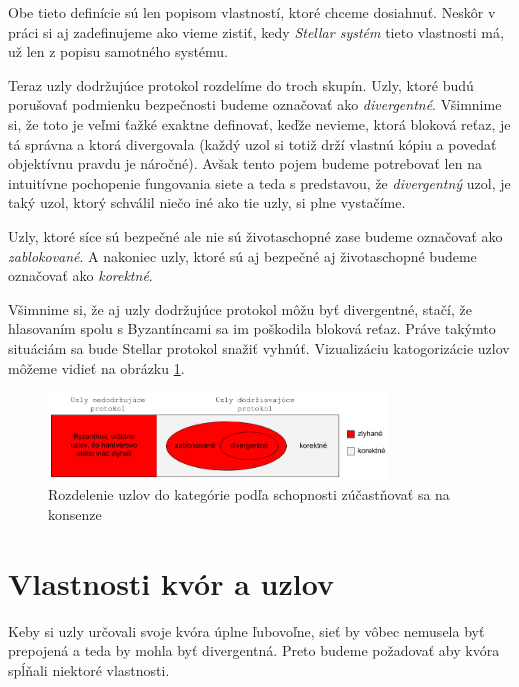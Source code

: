 \vspace{4mm}
Obe tieto definície sú len popisom vlastností, ktoré chceme dosiahnuť.
Neskôr v práci si aj zadefinujeme ako vieme zistiť, kedy \textit{Stellar systém}
tieto vlastnosti má, už len z popisu samotného systému.

Teraz uzly dodržujúce protokol rozdelíme do troch skupín. Uzly, ktoré budú porušovať
podmienku bezpečnosti budeme označovať ako \textit{divergentné}. Všimnime si, že
toto je veľmi ťažké exaktne definovať, keďže nevieme, ktorá bloková reťaz,
je tá správna a ktorá divergovala (každý uzol si totiž drží vlastnú kópiu a
povedať objektívnu pravdu je náročné).
Avšak tento pojem budeme potrebovať len na intuitívne pochopenie fungovania siete
a teda s predstavou, že \textit{divergentný} uzol, je taký uzol, ktorý schválil
niečo iné ako tie  uzly, si plne vystačíme.

Uzly, ktoré síce sú bezpečné ale nie sú životaschopné zase budeme označovať ako
\textit{zablokované}. A nakoniec uzly, ktoré sú aj bezpečné aj životaschopné budeme
označovať ako \textit{korektné}.

Všimnime si, že aj uzly dodržujúce protokol môžu byť divergentné, stačí, že
hlasovaním spolu s Byzantíncami sa im poškodila bloková reťaz. Práve takýmto
situáciám sa bude Stellar protokol snažiť vyhnúť.
Vizualizáciu katogorizácie uzlov môžeme vidieť na obrázku \ref{obr:typy_uzlov}.

\begin{figure}
\centerline{\includegraphics[width=0.8\textwidth]{images/rozdelenie_uzlov}}
\caption[Kategorizácia uzlov]{Rozdelenie uzlov do kategórie podľa schopnosti
zúčastňovať sa na konsenze} \label{obr:typy_uzlov}
\end{figure}

\section {Vlastnosti kvór a uzlov}

Keby si uzly určovali svoje kvóra úplne ľubovoľne, sieť by vôbec nemusela byť
prepojená a teda by mohla byť divergentná. Preto budeme požadovať aby kvóra
spĺňali niektoré vlastnosti.

